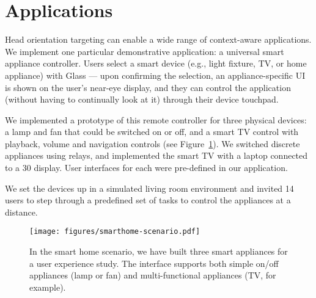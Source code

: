 \section{Applications}
\label{sec:applications}

Head orientation targeting can enable a wide range of context-aware applications. We implement one particular demonstrative application: a universal smart appliance controller. Users select a smart device (e.g., light fixture, TV, or home appliance) with Glass --- upon confirming the selection, an appliance-specific UI is shown on the user's near-eye display, and they can control the application (without having to continually look at it) through their device touchpad.

We implemented a prototype of this remote controller for three physical devices: a lamp and fan that could be switched on or off, and a smart TV control with playback, volume and navigation controls (see Figure~\ref{fig:smart-home}). We switched discrete appliances using relays, and implemented the smart TV with a laptop connected to a 30\inch{} display. User interfaces for each were pre-defined in our application. 

We set the devices up in a simulated living room environment and invited 14 users to step through a predefined set of tasks to control the appliances at a distance. 



\begin{figure}[t]
\centering
\texttt{[image: figures/smarthome-scenario.pdf]}
\caption{In the smart home scenario, we have built three smart appliances for a user experience study. The interface supports both simple on/off appliances (lamp or fan) and multi-functional appliances (TV, for example).}
\label{fig:smart-home}
\end{figure}

